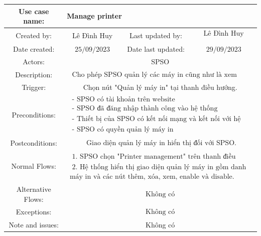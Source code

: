\begin{tabular}{|c|c|c|c|}
\hline Use case name: & \multicolumn{3}{|l|}{ Manage printer} \\
\hline Created by: & Lê Đình Huy & Last updated by: & $\begin{array}{l}\text { Lê Đình Huy } \\\end{array}$ \\
\hline Date created: & $25 / 09 / 2023$ & Date last updated: & $29 / 09 / 2023$\\
\hline Actors: & \multicolumn{3}{|c|}{ SPSO } \\
\hline Description: & \multicolumn{3}{|c|}{$\begin{array}{l}\text { Cho phép SPSO quản lý các máy in cũng như là xem danh sách các máy in.}\end{array}$} \\
\hline Trigger: & \multicolumn{3}{|c|}{ Chọn nút "Quản lý máy in" tại thanh điều hướng. } \\
\hline Preconditions: & \multicolumn{3}{|c|}{$\begin{array}{l}\text { - SPSO có tài khoản trên website } \\
\text { - SPSO đã đăng nhập thành công vào hệ thống } \\
\text { - Thiết bị của SPSO có kết nối mạng và kết nối với hệ thống }\\
\text { - SPSO có quyền quản lý máy in }\end{array}$} \\
\hline Postconditions: & \multicolumn{3}{|c|}{$\begin{array}{l}\text { Giao diện quản lý máy in hiển thị đối với SPSO.} \end{array}$} \\
\hline Normal Flows: & \multicolumn{3}{|c|}{$\begin{array}{l}\text { 1. SPSO chọn "Printer management" trên thanh điều hướng. } \\
\text { 2. Hệ thống hiển thị giao diện quản lý máy in gồm danh sách các}\\
\text{máy in và các nút thêm, xóa, xem, enable và disable. } \end{array}$} \\
\hline  Alternative Flows: & \multicolumn{3}{|c|}{$\begin{array}{l} 
\text {Không có}\end{array}$} \\
\hline Exceptions: & \multicolumn{3}{|c|}{$\begin{array}{l}
\text {Không có}\end{array}$} \\
\hline Note and issues: & \multicolumn{3}{|c|}{ Không có } \\
\hline
\end{tabular}

